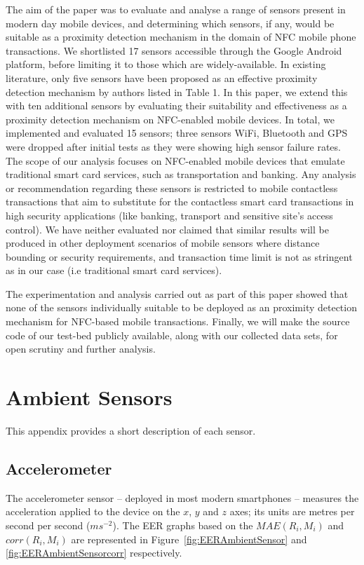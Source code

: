 \documentclass{article}
\begin{document}
The aim of the paper was to evaluate and analyse a range of sensors present in modern day mobile devices, and determining which sensors, if any, would be suitable as a proximity detection mechanism in the domain of NFC mobile phone transactions.  We shortlisted 17 sensors accessible through the Google Android platform, before limiting it to those which are widely-available.  In existing literature, only five sensors have been proposed as an effective proximity detection mechanism by authors listed in Table 1. In this paper, we extend this with ten additional sensors by evaluating their suitability and effectiveness as a proximity detection mechanism on NFC-enabled mobile devices.  In total, we implemented and evaluated 15 sensors; three sensors WiFi, Bluetooth and GPS were dropped after initial tests as they were showing high sensor failure rates.  The scope of our analysis focuses on NFC-enabled mobile devices that emulate traditional smart card services, such as transportation and banking.  Any analysis or recommendation regarding these sensors is restricted to mobile contactless transactions that aim to substitute for the contactless smart card transactions in high security applications (like banking, transport and sensitive site's access control). We have neither evaluated nor claimed that similar results will be produced in other deployment scenarios of mobile sensors where distance bounding or security requirements, and transaction time limit is not as stringent as in our case (i.e traditional smart card services). 

The experimentation and analysis carried out as part of this paper showed that none of the sensors individually suitable to be deployed as an proximity detection mechanism for NFC-based mobile transactions. Finally, we will make the source code of our test-bed publicly available, along with our collected data sets, for open scrutiny and further analysis.



{\footnotesize 
}
\appendix
\section{Ambient Sensors}
\label{sec:AmbientSensors}
This appendix provides a short description of each sensor. 

\subsection{Accelerometer}
The accelerometer sensor -- deployed in most modern smartphones -- measures the acceleration applied to the device on the $x$, $y$ and $z$ axes; its units are metres per second per second ($ms^{-2}$). The EER graphs based on the $MAE(R_i, M_i)$ and $corr(R_i, M_i)$ are represented in Figure~\ref{fig:EERAmbientSensor} and \ref{fig:EERAmbientSensorcorr} respectively.
\end{document}
